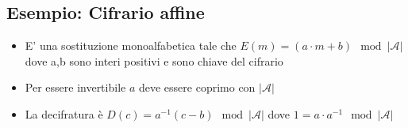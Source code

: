 \documentclass[12pt, a4paper]{report}
\begin{document}
\subsection{Esempio: Cifrario affine}
\begin{itemize}
    \item E' una sostituzione monoalfabetica tale che $E(m)=(a\cdot m+b) \mod |\mathcal{A}|$ dove a,b sono interi positivi e sono chiave del cifrario
    \item Per essere invertibile $a$ deve essere coprimo con $|\mathcal{A}|$
    \item La decifratura è $D(c) = a^{-1}(c-b) \mod |\mathcal{A}|$ dove $1 = a\cdot a^{-1}\mod |\mathcal{A}|$
\end{itemize}
\end{document}
